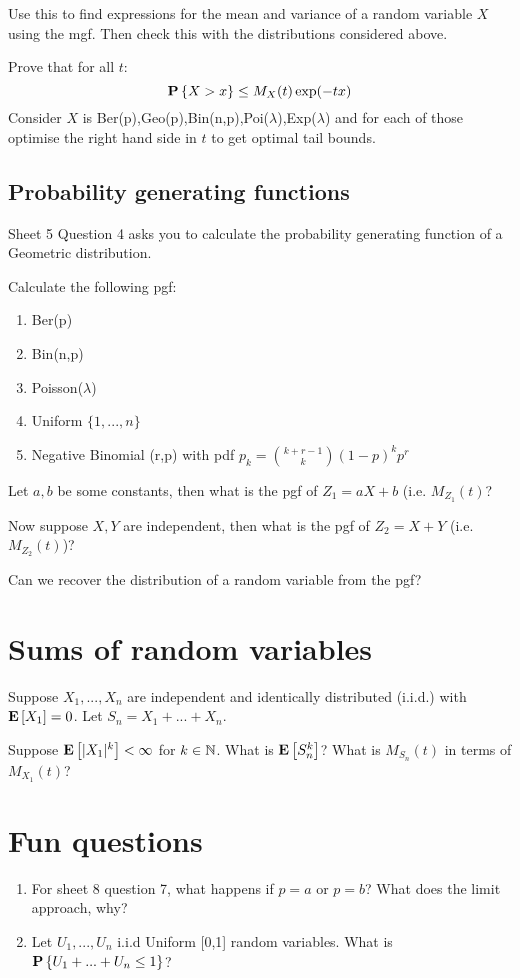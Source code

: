\documentclass{article}
\begin{document}
Use this to find expressions for the mean and variance of a random variable $X$ using the mgf.
Then check this with the distributions considered above.

Prove that for all $t$:
\begin{equation*}
    {\mathbf P}\left\{X>x\right\}\leq M_X(t)\exp(-tx)
\end{equation*}
Consider $X$ is Ber(p),Geo(p),Bin(n,p),Poi($\lambda$),Exp($\lambda$) and for each of those optimise the right hand side in $t$ to get optimal tail bounds.
\subsection{Probability generating functions}
Sheet 5 Question 4 asks you to calculate the probability generating function of a Geometric distribution.

Calculate the following pgf:
\begin{enumerate}
    \item Ber(p)
    \item Bin(n,p)
    \item Poisson($\lambda$)
    \item Uniform $\{1,...,n\}$
    \item Negative Binomial (r,p) with pdf $p_k={k+r-1 \choose k}(1-p)^kp^r$
\end{enumerate}
Let $a,b$ be some constants, then what is the pgf of $Z_1=aX+b$ (i.e. $M_{Z_1}(t)$?

Now suppose $X,Y$ are independent, then what is the pgf of $Z_2=X+Y$ (i.e. $M_{Z_2}(t)$)?

Can we recover the distribution of a random variable from the pgf?
\section{Sums of random variables}
Suppose $X_1,...,X_n$ are independent and identically distributed (i.i.d.) with ${\mathbf E}\left[X_1\right]=0$.
Let $S_n=X_1+...+X_n$.

Suppose ${\mathbf E}\left[|X_1|^k\right]<\infty$ for $k\in{\mathbb N}$.
What is ${\mathbf E}\left[S_n^k\right]$? What is $M_{S_n}(t)$ in terms of $M_{X_1}(t)$?
\section{Fun questions}
\begin{enumerate}
    \item For sheet 8 question 7, what happens if $p=a$ or $p=b$? What does the limit approach, why?
    \item Let $U_1,...,U_n$ i.i.d Uniform [0,1] random variables. What is ${\mathbf P}\left\{U_1+...+U_n\leq1\right\}$?
\end{enumerate}
\end{document}
